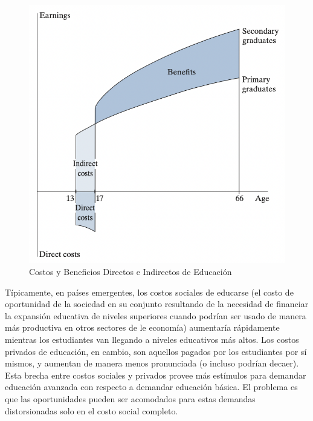 \documentclass[a4paper]{article}
\theoremstyle{plain}
\theoremstyle{definition}
\begin{document}
\begin{figure}[h]
    \centering
    \includegraphics[scale=0.7]{figuras/Costos y beneficios de invertir.png}
    \caption{Costos y Beneficios Directos e Indirectos de Educación}
    \label{fig:my_label}
\end{figure}

Típicamente, en países emergentes, los costos sociales de educarse (el costo de oportunidad de la sociedad en su conjunto resultando de la necesidad de financiar la expansión educativa de niveles superiores cuando podrían ser usado de manera más productiva en otros sectores de le economía) aumentaría rápidamente mientras los estudiantes van llegando a niveles educativos más altos. Los costos privados de educación, en cambio, son aquellos pagados por los estudiantes por sí mismos, y aumentan de manera menos pronunciada (o incluso podrían decaer). Esta brecha entre costos sociales y privados provee más estímulos para demandar educación avanzada con respecto a demandar educación básica. El problema es que las oportunidades pueden ser acomodados para estas demandas distorsionadas solo en el costo social completo. 
\end{document}
